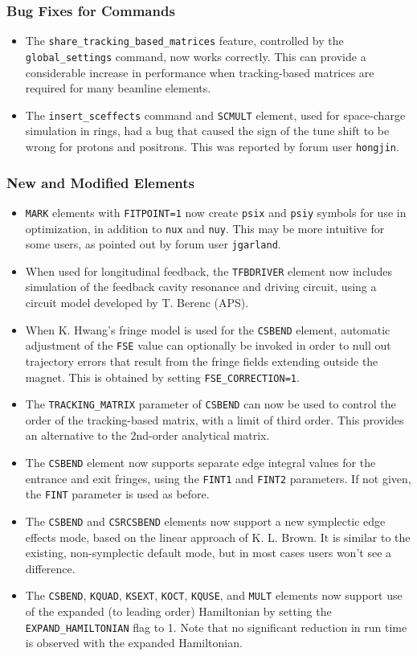 \documentclass[11pt]{article}
\begin{document}
\subsubsection{Bug Fixes for Commands}
\begin{itemize}
\item The \verb|share_tracking_based_matrices| feature, controlled by the \verb|global_settings| command, now
  works correctly. This can provide a considerable increase in performance when tracking-based matrices are
  required for many beamline elements.
\item The \verb|insert_sceffects| command  and \verb|SCMULT| element, used for space-charge simulation in rings,
  had a bug that caused the sign of the tune shift to be wrong for protons and positrons. This was reported by
  forum user \verb|hongjin|.
\end{itemize}

\subsubsection{New and Modified Elements}
\begin{itemize}
\item \verb|MARK| elements with \verb|FITPOINT=1| now create \verb|psix| and \verb|psiy| symbols for use in
  optimization, in addition to \verb|nux| and \verb|nuy|. This may be more intuitive for some users, as pointed
  out by forum user \verb|jgarland|.
\item When used for longitudinal feedback, the \verb|TFBDRIVER| element now includes simulation of the 
  feedback cavity resonance and driving circuit, using a circuit model developed by T. Berenc (APS).
\item When K. Hwang's fringe model is used for the \verb|CSBEND| element, automatic adjustment of the \verb|FSE|
  value can optionally be invoked in order to null out trajectory errors that result from the fringe fields extending outside
  the magnet. This is obtained by setting \verb|FSE_CORRECTION=1|.
\item The \verb|TRACKING_MATRIX| parameter of \verb|CSBEND| can now be used to control the order of the tracking-based
  matrix, with a limit of third order. This provides an alternative to the 2nd-order analytical matrix.
\item The \verb|CSBEND| element now supports separate edge integral values for the entrance and exit fringes, using the
  \verb|FINT1| and \verb|FINT2| parameters. If not given, the \verb|FINT| parameter is used as before.
\item The \verb|CSBEND| and \verb|CSRCSBEND| elements now support a new symplectic edge effects mode, based on 
  the linear approach of K. L. Brown. It is similar to the existing, non-symplectic default mode, but in most cases
  users won't see a difference.
\item The \verb|CSBEND|, \verb|KQUAD|, \verb|KSEXT|, \verb|KOCT|, \verb|KQUSE|, and \verb|MULT| elements now support use
  of the expanded (to leading order) Hamiltonian by setting the \verb|EXPAND_HAMILTONIAN| flag to 1. Note that no significant
  reduction in run time is observed with the expanded Hamiltonian.
\end{itemize}
\end{document}
